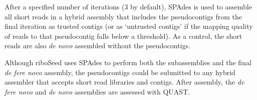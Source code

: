\documentclass[10pt]{article}
\begin{document}
\begin{linenumbers}
After a specified number of iterations (3 by default), SPAdes is used to assemble all short reads in a hybrid assembly that includes the pseudocontigs from the final iteration as trusted contigs (or as ‘untrusted contigs’ if the mapping quality of reads to that pseudocontig falls below a threshold). As a control, the short reads are also \textit{de novo} assembled without the pseudocontigs.


Although riboSeed uses SPAdes to perform both the subassemblies and the final \textit{de fere novo} assembly, the pseudocontigs could be submitted to any hybrid assembler that accepts short read libraries and contigs. After assembly, the \textit{de fere novo} and \textit{de novo} assemblies are assessed with QUAST\cite{Gurevich2013}.

\begin{figure}[h]
  \centering
  \begin{minipage}{.6\linewidth}
    \begin{algorithm}[H]

\end{algorithm}
\end{minipage}
\end{figure}
\end{linenumbers}
\end{document}

